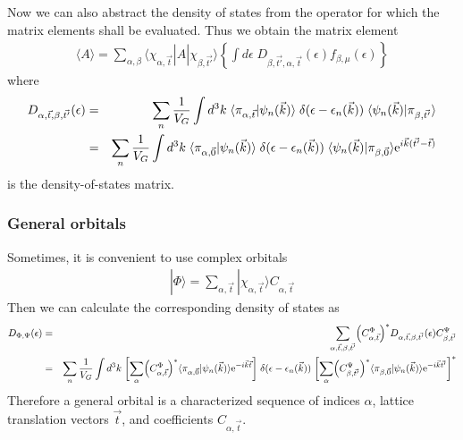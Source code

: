 \documentclass[11pt,a4paper]{report}
\begin{document}
Now we can also abstract the density of states from the operator for
which the matrix elements shall be evaluated.
Thus we obtain the matrix element
\begin{eqnarray}
\langle{A}\rangle=
\sum_{\alpha,\beta}\langle\chi_{\alpha,\vec{t}}|\hat{A}|\chi_{\beta,\vec{t'}}\rangle
\left\lbrace\int d\epsilon\; D_{\beta,\vec{t'},\alpha,\vec{t}}(\epsilon)
f_{\beta,\mu}(\epsilon)\right\rbrace
\end{eqnarray}
where
\begin{eqnarray}
D_{\alpha,\vec{t},\beta,\vec{t'}}(\epsilon)
&=&
\sum_n\frac{1}{V_G}\int d^3k\; 
\langle\pi_{\alpha,\vec{t}}|\psi_n(\vec{k})\rangle
\;\delta(\epsilon-\epsilon_n(\vec{k}))\;
\langle\psi_n(\vec{k})|\pi_{\beta,\vec{t'}}\rangle
\nonumber\\
&=&
\sum_n\frac{1}{V_G}\int d^3k\; 
\langle\pi_{\alpha,\vec{0}}|\psi_n(\vec{k})\rangle
\;\delta(\epsilon-\epsilon_n(\vec{k}))\;
\langle\psi_n(\vec{k})|\pi_{\beta,\vec{0}}\rangle\mathrm{e}^{i\vec{k}(\vec{t'}-\vec{t})}
\end{eqnarray}
is the density-of-states matrix.

\subsubsection{General orbitals}
Sometimes, it is convenient to use complex orbitals
\begin{eqnarray}
|\Phi\rangle=\sum_{\alpha,\vec{t}}|\chi_{\alpha,\vec{t}}\rangle C_{\alpha,\vec{t}}
\end{eqnarray}
Then we can calculate the corresponding density of states
as
\begin{eqnarray}
D_{\Phi,\Psi}(\epsilon)
&=&\sum_{\alpha,\vec{t},\beta,\vec{t'}}
\Bigl(C^\Phi_{\alpha,\vec{t}}\Bigr)^*
D_{\alpha,\vec{t},\beta,\vec{t'}}(\epsilon)
C^\Psi_{\beta,\vec{t'}}
\nonumber\\
&=&
\sum_n\frac{1}{V_G}\int d^3k\; 
\biggl[\sum_\alpha \Bigl(C^\Phi_{\alpha,\vec{t}}\Bigr)^*
\langle\pi_{\alpha,\vec{0}}|\psi_n(\vec{k})\rangle
\mathrm{e}^{-i\vec{k}\vec{t}}
\biggr]
\;\delta(\epsilon-\epsilon_n(\vec{k}))\;
\biggl[\sum_\alpha 
\Bigl(C^\Psi_{\beta,\vec{t'}}\Bigr)^*
\langle\pi_{\beta,\vec{0}}|\psi_n(\vec{k})\rangle
\mathrm{e}^{-i\vec{k}\vec{t'}}
\biggr]^*
\nonumber\\
\end{eqnarray}
Therefore a general orbital is a characterized sequence of indices $\alpha$,
lattice translation vectors $\vec{t}$, and coefficients $C_{\alpha,\vec{t}}$.
\end{document}
